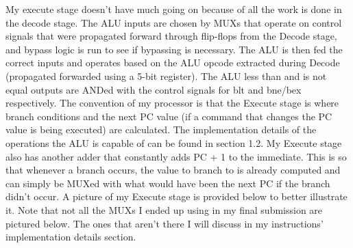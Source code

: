 \documentclass[letterpaper]{article} %
\begin{document}
    My execute stage doesn't have much going on because of all the work is done in the decode stage. The ALU inputs are chosen by MUXs that operate on control signals that were propagated forward through flip-flops from the Decode stage, and bypass logic is run to see if bypassing is necessary. The ALU is then fed the correct inputs and operates based on the ALU opcode extracted during Decode (propagated forwarded using a 5-bit register). The ALU less than and is not equal outputs are ANDed with the control signals for blt and bne/bex respectively. The convention of my processor is that the Execute stage is where branch conditions and the next PC value (if a command that changes the PC value is being executed) are calculated. The implementation details of the operations the ALU is capable of can be found in section 1.2. My Execute stage also has another adder that constantly adds PC + 1 to the immediate. This is so that whenever a branch occurs, the value to branch to is already computed and can simply be MUXed with what would have been the next PC if the branch didn't occur. A picture of my Execute stage is provided below to better illustrate it. Note that not all the MUXs I ended up using in my final submission are pictured below. The ones that aren't there I will discuss in my instructions' implementation details section.
    
               \FloatBarrier
\end{document}
